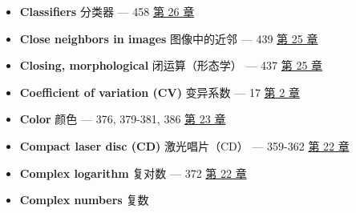 \begin{itemize}
{  transform}（离散傅里叶变换）条下
\item
  \textbf{Classifiers} 分类器 --- 458  \hyperref[ch-26]{第 26
  章}
\item
  \textbf{Close neighbors in images} 图像中的近邻 --- 439 
  \hyperref[ch-25]{第 25 章}
\item
  \textbf{Closing, morphological} 闭运算（形态学） --- 437 
  \hyperref[ch-25]{第 25 章}
\item
  \textbf{Coefficient of variation (CV)} 变异系数 --- 17 
  \hyperref[ch-02]{第 2 章}
\item
  \textbf{Color} 颜色 --- 376, 379-381, 386 
  \hyperref[ch-23]{第 23 章}
\item
  \textbf{Compact laser disc (CD)} 激光唱片（CD） --- 359-362 
  \hyperref[ch-22]{第 22 章}
\item
  \textbf{Complex logarithm} 复对数 --- 372 
  \hyperref[ch-22]{第 22 章}
\item
  \textbf{Complex numbers} 复数


\end{itemize}
